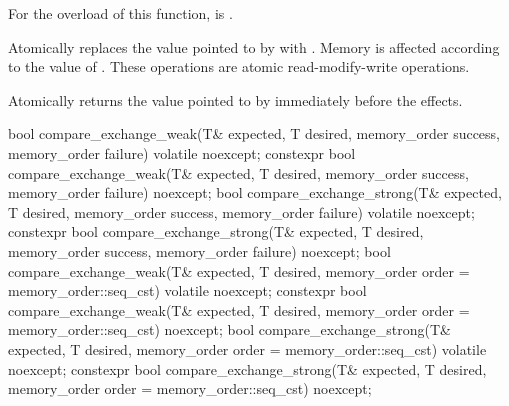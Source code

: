 \begin{itemdescr}
\pnum
\constraints
For the  overload of this function,
 is .

\pnum
\effects
Atomically replaces the value pointed to by 
with .
Memory is affected according to the value of .
These operations are atomic read-modify-write operations.

\pnum
\returns
Atomically returns the value pointed to by  immediately before the effects.
\end{itemdescr}

%
%
%
%
%
%
%
%
%
%
%
%
\begin{itemdecl}
bool compare_exchange_weak(T& expected, T desired,
                           memory_order success, memory_order failure) volatile noexcept;
constexpr bool compare_exchange_weak(T& expected, T desired,
                           memory_order success, memory_order failure) noexcept;
bool compare_exchange_strong(T& expected, T desired,
                             memory_order success, memory_order failure) volatile noexcept;
constexpr bool compare_exchange_strong(T& expected, T desired,
                             memory_order success, memory_order failure) noexcept;
bool compare_exchange_weak(T& expected, T desired,
                           memory_order order = memory_order::seq_cst) volatile noexcept;
constexpr bool compare_exchange_weak(T& expected, T desired,
                           memory_order order = memory_order::seq_cst) noexcept;
bool compare_exchange_strong(T& expected, T desired,
                             memory_order order = memory_order::seq_cst) volatile noexcept;
constexpr bool compare_exchange_strong(T& expected, T desired,
                             memory_order order = memory_order::seq_cst) noexcept;
\end{itemdecl}

